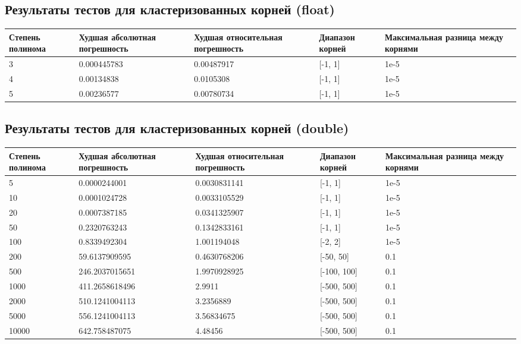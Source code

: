 \documentclass[a4paper,12pt]{article}
\begin{document}
\subsection{Результаты тестов для кластеризованных корней (float)}
\begin{center}
  \begin{tabular}{|p{3.0cm}|p{3.0cm}|p{3.0cm}|p{3.0cm}|p{3.0cm}|}
  \hline
  \textbf{Степень полинома}  &  \textbf{Худшая абсолютная погрешность} & \textbf{Худшая относительная погрешность}  & \textbf{Диапазон корней} & \textbf{Максимальная разница между корнями} \\
  \hline
  3 & 0.000445783 & 0.00487917 & [-1, 1] & 1e-5\\
  \hline
  4 & 0.00134838 & 0.0105308 & [-1, 1] & 1e-5\\
  \hline
  5 & 0.00236577 & 0.00780734 & [-1, 1] & 1e-5\\
  \hline
\end{tabular}
\label{tab:my_label_2}
\end{center}

\subsection{Результаты тестов для кластеризованных корней (double)}
\begin{center}
  \begin{tabular}{|p{3.0cm}|p{3.0cm}|p{3.0cm}|p{3.0cm}|p{3.0cm}|}
  \hline
  \textbf{Степень полинома}  &  \textbf{Худшая абсолютная погрешность} & \textbf{Худшая относительная погрешность} & \textbf{Диапазон корней} & \textbf{Максимальная разница между корнями}\\
  \hline
  5 & 0.0000244001 & 0.0030831141 & [-1, 1] & 1e-5\\
  \hline
  10 & 0.0001024728 & 0.0033105529 & [-1, 1] & 1e-5\\
  \hline
  20 & 0.0007387185 & 0.0341325907 & [-1, 1] & 1e-5\\
  \hline
  50 & 0.2320763243 & 0.1342833161 & [-1, 1] & 1e-5\\
  \hline
  100 & 0.8339492304 & 1.001194048 & [-2, 2] & 1e-5\\
  \hline
  200 & 59.6137909595 & 0.4630768206 & [-50, 50] & 0.1\\
  \hline
  500 & 246.2037015651 & 1.9970928925 & [-100, 100] & 0.1\\
  \hline
  1000 & 411.2658618496 & 2.9911 & [-500, 500] & 0.1\\
  \hline
  2000 & 510.1241004113 & 3.2356889 & [-500, 500] & 0.1\\
  \hline
  5000 & 556.1241004113 & 3.56834675 & [-500, 500] & 0.1\\
  \hline
  10000 & 642.758487075 & 4.48456 & [-500, 500] & 0.1\\
  \hline
\end{tabular}
\label{tab:my_label_2}
\end{center}
\end{document}
